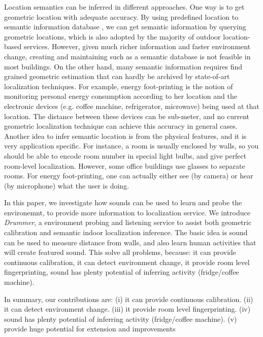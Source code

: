 Location semantics can be inferred in different approaches. One way is to get geometric location with 
adequate accuracy. By using predefined location to semantic information database \fxnote{[cite]}, we can get semantic information
by querying geometric locations, which is also adopted by the majority of outdoor location-based services.
However, given much richer information and faster environment change, creating and maintaining such as a
semantic database is not feasible in most buildings. On the other hand, many semantic information requires
find grained geometric estimation that can hardly be archived by state-of-art localization techniques. For 
example, energy foot-printing \fxnote{[cite]} is the notion of monitoring personal energy consumption
according to her location and 
the electronic devices (e.g. coffee machine, refrigerator, microwave) being used at that location. The 
distance between these devices can be sub-meter, and no current geometric localization technique can achieve this 
accuracy in general cases. Another idea to infer semantic location is from the physical features, and it is very application
specific. For instance, a room is usually enclosed by walls, so you should be able to encode room number in 
special light bulbs, and give perfect room-level localization. However, some office buildings use glasses to separate
rooms. %
For energy foot-printing, one can actually either see (by camera) or hear (by microphone) what the user is doing.



In this paper, we investigate how sounds can be used to learn and probe the environemnt, to provide more information
to localization service. We introduce {\em Drummer}, a environment probing and listening service 
to assist both geometric calibration and semantic indoor localization inference. The basic idea is sound 
can be used to measure distance from walls, and also learn human activities that will create featured sound.
This solve all problems, because: it can 
provide continuous calibration, it can detect environment change, 
it provide room level fingerprinting, sound has plenty potential of inferring activity (fridge/coffee machine).


In summary, our contributions are: (i) it can provide continuous calibration. (ii) it can detect environment change. 
(iii) it provide room level fingerprinting. (iv) sound has plenty potential of inferring activity (fridge/coffee machine).
(v) provide huge potential for extension and improvements

